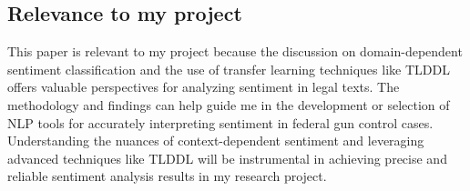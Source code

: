 \subsection{Relevance to my project}
This paper is relevant to my project because the discussion on domain-dependent sentiment classification and the use of transfer learning techniques like TLDDL offers valuable perspectives for analyzing sentiment in legal texts. The methodology and findings can help guide me in the development or selection of NLP tools for accurately interpreting sentiment in federal gun control cases. Understanding the nuances of context-dependent sentiment and leveraging advanced techniques like TLDDL will be instrumental in achieving precise and reliable sentiment analysis results in my research project.